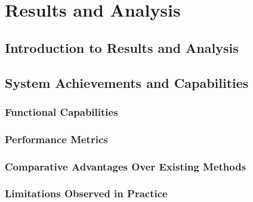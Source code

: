 \chapter{Results and Analysis}

\section{Introduction to Results and Analysis}

\section{System Achievements and Capabilities}

\subsection{Functional Capabilities}

\subsection{Performance Metrics}

\subsection{Comparative Advantages Over Existing Methods}

\subsection{Limitations Observed in Practice}

